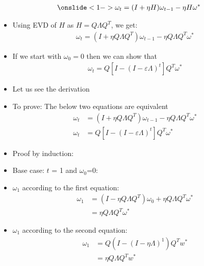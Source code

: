 \begin{frame}
	\begin{align*}
		\onslide<1->\omega_t=(I+\eta H)\omega_{t-1}-\eta H \omega^{*} 
	\end{align*}
	\begin{itemize}
		\justifying
		\item<2-> Using EVD of $H$ as $H=Q \Lambda Q^{T}$, we get:
		\begin{align*}
			\omega_t=(I+\eta Q \Lambda Q^{T} )\omega_{t-1}-\eta Q \Lambda Q^{T} \omega^{*} 
		\end{align*}
		\item<3-> If we start with $\omega_{0}=0$ then we can show that 
		\begin{align*}
			\omega_t=Q[I-(I-\varepsilon \Lambda)^{t}]Q^{T}\omega^{*} 
		\end{align*}
		\item<4-> Let us see the derivation
	\end{itemize}
\end{frame}

\begin{frame}
	\begin{overlayarea}{\textwidth}{\textheight}
		\begin{itemize}
			\item<1-> To prove: The below two equations are equivalent
				\begin{align*}
					\omega_t & = (I+\eta Q \Lambda Q^{T} )\omega_{t-1}-\eta Q \Lambda Q^{T} \omega^{*}\\
					\omega_t & = Q[I-(I-\varepsilon \Lambda)^{t}]Q^{T}\omega^{*} 
				\end{align*}
			\item<2-> Proof by induction:
			\item<3-> Base case: $t$ = 1 and $\omega_0$=0:
			\item<4-> $\omega_1$ according to the first equation:
				\begin{align*}
					\omega_1 & = (I - \eta Q\Lambda Q^T) \omega_0 + \eta Q\Lambda Q^T \omega^* \\
					         & = \eta Q\Lambda Q^T \omega^*
				\end{align*}
			\item<5-> $\omega_1$ according to the second equation:
                \begin{align*}
					\omega_1 & = Q(I - (I - \eta \Lambda)^1)Q^T w^*\\
                  			 & = \eta Q\Lambda Q^T w^*
                \end{align*}
        \end{itemize}
	\end{overlayarea}
\end{frame}

